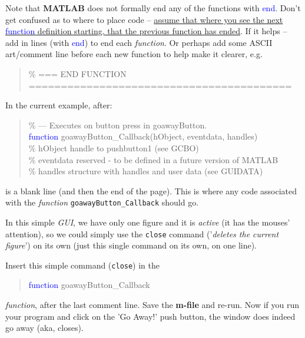 \documentclass{tufte-book} %
\newenvironment{docspec}{\begin{quotation}\ttfamily\parskip0pt\parindent0pt\ignorespaces}{\end{quotation}}
\begin{document}
Note that \textbf{MATLAB} does not formally end any of the functions with \textcolor{blue}{end}. Don't get confused as to where to place code -- \uline{assume that where you see the next \textcolor{blue}{function} definition starting, that the previous function has ended}. If it helps -- add in lines (with \textcolor{blue}{end}) to end each \textit{function}. Or perhaps add some ASCII art/comment line before each new function to help make it clearer, e.g.
\begin{docspec}
\textcolor[rgb]{0,0.501961,0}{\% === END FUNCTION =========================================}
\end{docspec}
In the current example, after:
\begin{docspec}
\textcolor[rgb]{0,0.501961,0}{\% --- Executes on button press in goawayButton.\\}
\textcolor{blue}{function} goawayButton\_Callback(hObject, eventdata, handles)\\
\textcolor[rgb]{0,0.501961,0}{\% hObject    handle to pushbutton1 (see GCBO)\\
\% eventdata  reserved - to be defined in a future version of MATLAB\\
\% handles    structure with handles and user data (see GUIDATA)}
\end{docspec}
is a blank line (and then the end of the page). This is where any code associated with the \textit{function} \texttt{goawayButton\_Callback} should go.

In this simple \textit{GUI}, we have only one figure and it is \textit{active} (it has the mouses' attention), so we could simply use the \texttt{close} command ('\textit{deletes the current figure}') on its own (just this single command on its own, on one line).

Insert this simple command (\texttt{close}) in the
\begin{docspec}
\textcolor{blue}{function} goawayButton\_Callback
\end{docspec}
 \textit{function}, after the last comment line. Save the \textbf{m-file} and re-run. Now if you run your program and click on the 'Go Away!' push button, the window does indeed go away (aka, closes).
\end{document}
